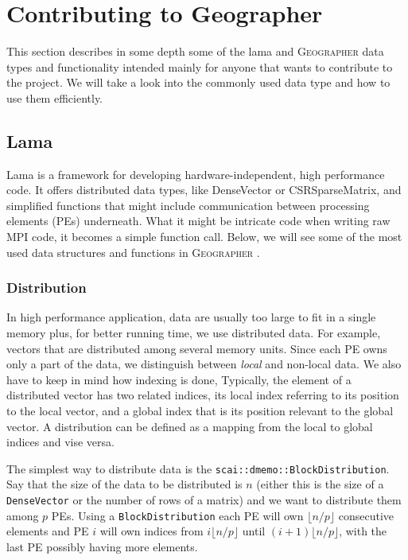 \documentclass[a4paper,10pt]{article}
\author{Harry Tzovas}
\newcommand{\geo}{\textsc{Geographer} }
\newcommand{\MI}[1]{\texttt{#1}}
\begin{document}
\section*{Contributing to Geographer}

This section describes in some depth some of the lama and \geo data types and functionality intended
mainly for anyone that wants to contribute to the project. We will take a look into the commonly
used data type and how to use them efficiently.

\subsection*{Lama}

Lama is a framework for developing hardware-independent, high performance code. It offers distributed 
data types, like DenseVector or CSRSparseMatrix, and simplified functions that might include communication
between processing elements (PEs) underneath. What it might be intricate code when writing raw MPI code,
it becomes a simple function call. Below, we will see some of the most used data structures and 
functions in \geo.


\subsubsection*{Distribution}

In high performance application, data are usually too large to fit in a single memory plus, for
better running time, we use distributed data. For example, vectors that are distributed among several
memory units. Since each PE owns only a part of the data, we distinguish between \emph{local} 
and non-local data. We also have to keep in mind how indexing is done, Typically, the element
of a distributed vector has two related indices, its local index referring to its position
to the local vector, and a global index that is its position relevant to the global vector.
A distribution can be defined as a mapping from the local to global indices and vise versa.

The simplest way to distribute data
is the \MI{scai::dmemo::BlockDistribution}. Say that the size of the data to be distributed is $n$
(either this is the size of a \MI{DenseVector} or the number of rows of a matrix) and we want
to distribute them among $p$ PEs. Using a \MI{BlockDistribution} each PE will own $\lfloor n/p \rfloor$
consecutive elements and PE $i$ will own indices from $i\lfloor n/p \rfloor$ until $(i+1)\lfloor n/p \rfloor$,
with the last PE possibly having more elements.
\end{document}
